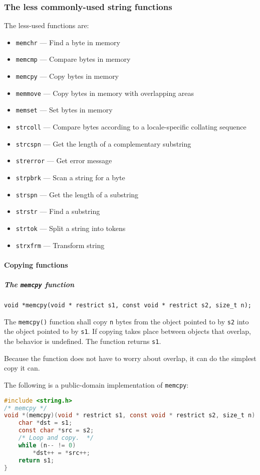 \subsubsection{The less commonly-used string functions}
The less-used functions are:

\begin{itemize}
	\item \texttt{memchr} --- Find a byte in memory
	\item \texttt{memcmp} --- Compare bytes in memory
	\item \texttt{memcpy} --- Copy bytes in memory
	\item \texttt{memmove} --- Copy bytes in memory with overlapping areas
	\item \texttt{memset} --- Set bytes in memory
	\item \texttt{strcoll} --- Compare bytes according to a locale-specific collating sequence
	\item \texttt{strcspn} --- Get the length of a complementary substring
	\item \texttt{strerror} --- Get error message
	\item \texttt{strpbrk} --- Scan a string for a byte
	\item \texttt{strspn} --- Get the length of a substring
	\item \texttt{strstr} --- Find a substring
	\item \texttt{strtok} --- Split a string into tokens
	\item \texttt{strxfrm} --- Transform string
\end{itemize}

\paragraph{Copying functions}
\subparagraph{The \texttt{memcpy} function}
\texttt{void *memcpy(void * restrict s1, const void * restrict s2, size\_t n);}

The \texttt{memcpy()} function shall copy \texttt{n} bytes from the object
pointed to by \texttt{s2} into the object pointed to by \texttt{s1}. If copying
takes place between objects that overlap, the behavior is undefined. The
function returns \texttt{s1}.

Because the function does not have to worry about overlap, it can do the
simplest copy it can.

The following is a public-domain implementation of \texttt{memcpy}:
\lstset{basicstyle=\scriptsize, numbers=left, captionpos=b, tabsize=4}
\begin{lstlisting}[caption=Section \thesection listing \arabic{stringcnt},language={C},
breaklines=true,xleftmargin=15pt,label=lst:section\thesection listing\arabic{stringcnt}]
#include <string.h>
/* memcpy */
void *(memcpy)(void * restrict s1, const void * restrict s2, size_t n) {
	char *dst = s1;
	const char *src = s2;
	/* Loop and copy.  */
	while (n-- != 0)
		*dst++ = *src++;
	return s1;
}
\end{lstlisting}

